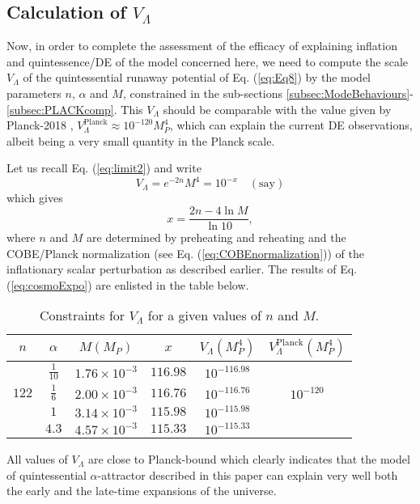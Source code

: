 \documentclass[a4paper,11pt]{article}
\begin{document}
\subsection{Calculation of \texorpdfstring{$V_{\Lambda}$}{V}}
\label{subsec:cosmological_constant}
Now, in order to complete the assessment of the efficacy of explaining inflation and quintessence/DE of the model concerned here, we need to compute the scale $V_{\Lambda}$ of the quintessential runaway potential of Eq. (\ref{eq:Eq8}) by the model parameters $n$, $\alpha$ and $M$, constrained in the sub-sections \ref{subsec:ModeBehaviours}-\ref{subsec:PLACKcomp}. This $V_{\Lambda}$ should be comparable with the value given by Planck-2018 \cite{Planck:2018jri,Planck:2018vyg}, $V_{\Lambda}^{\mathrm{Planck}}\approx 10^{-120} M_P^4$, which can explain the current DE observations, albeit being a very small quantity in the Planck scale.\par Let us recall Eq. (\ref{eq:limit2}) and write
\begin{equation}
    V_{\Lambda}=e^{-2n}M^4=10^{-x}\quad (\mathrm{say})
\end{equation} which gives
\begin{equation}
    x=\frac{2n-4\ln{M}}{\ln{10}},
    \label{eq:cosmoExpo}
\end{equation}
where $n$ and $M$ are determined by preheating and reheating and the COBE/Planck normalization (see Eq. (\ref{eq:COBEnormalization})) of the inflationary scalar perturbation as described earlier. The results of Eq. (\ref{eq:cosmoExpo}) are enlisted in the table below.
 \begin{table}[H]
    \captionsetup{justification=centering,width=1.0\textwidth}
    \caption{Constraints for $V_{\Lambda}$ for a given values of $n$ and $M$.}
    \begin{center}
        \begin{adjustbox}{width=0.6\textwidth}
        \begin{tabular}{|c|c|c|c|c|c|}
    \hline
    $n$ & $\alpha$ & $M (M_P)$ & $x$ & $V_{\Lambda} (M_P^4)$ & $V_{\Lambda}^{\mathrm{Planck}} (M_P^4)$\\
    \hline\hline
     & $\frac{1}{10}$ & $1.76\times 10^{-3}$ & $116.98$ & $10^{-116.98}$ & \\
    $122$ & $\frac{1}{6}$ & $2.00\times 10^{-3}$ & $116.76$ & $10^{-116.76}$ & $10^{-120}$\\
     & $1$ & $3.14\times 10^{-3}$ & $115.98$ & $10^{-115.98}$ & \\
     & $4.3$ & $4.57\times 10^{-3}$ & $115.33$ & $10^{-115.33}$ & \\
    \hline
    \end{tabular}
    \end{adjustbox}
    \end{center}
         \label{tab:Table2}
    \end{table}
All values of $V_{\Lambda}$ are close to Planck-bound which clearly indicates that the model of quintessential $\alpha$-attractor described in this paper can explain very well both the early and the late-time expansions of the universe.    
\end{document}
